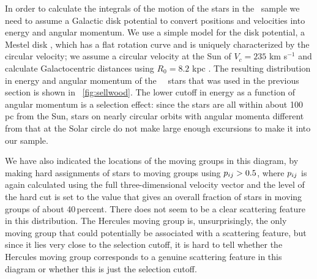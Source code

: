 In order to calculate the integrals of the motion of the stars in the
\gcsabb\ sample we need to assume a Galactic disk potential to convert
positions and velocities into energy and angular momentum. We use a
simple model for the disk potential, a Mestel disk
\citep{Mestel63a,2008gady.book.....B}, which has a flat rotation curve and
is uniquely characterized by the circular velocity; we assume a
circular velocity at the Sun of $V_c = 235$ km s$^{-1}$ and calculate
Galactocentric distances using $R_0 = 8.2$ kpc
\citep[\eg,][]{BovyXD}. The resulting distribution in energy and
angular momentum of the \ngcsstars\ \gcsabb\ stars that was used in
the previous section is shown in \figurename~\ref{fig:sellwood}. The
lower cutoff in energy as a function of angular momentum is a
selection effect: since the stars are all within about 100 pc from the
Sun, stars on nearly circular orbits with angular momenta different
from that at the Solar circle do not make large enough excursions to
make it into our sample.

We have also indicated the locations of the moving groups in this
diagram, by making hard assignments of stars to moving groups using
$p_{ij} > 0.5$, where $p_{ij}$ is again calculated using the full
three-dimensional velocity vector and the level of the hard cut is set
to the value that gives an overall fraction of stars in moving groups
of about 40\,percent. There does not seem to be a clear scattering
feature in this distribution. The Hercules moving group is,
unsurprisingly, the only moving group that could potentially be
associated with a scattering feature, but since it lies very close to
the selection cutoff, it is hard to tell whether the Hercules moving
group corresponds to a genuine scattering feature in this diagram or
whether this is just the selection cutoff.


